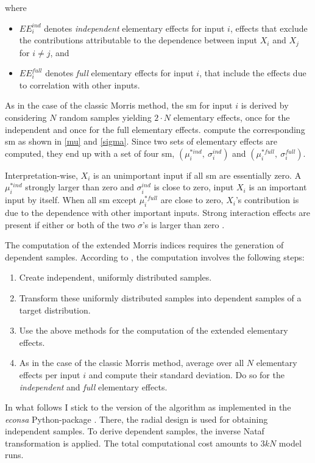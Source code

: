 \noindent where
\begin{itemize}
\item $EE_i^{ind}$ denotes \textit{independent} elementary effects for input $i$, effects that exclude the contributions attributable to the dependence between input $X_i$ and $X_j$ for $i \neq j$, and
\item $EE_i^{full}$ denotes \textit{full} elementary effects for input $i$, that include the effects due to correlation with other inputs.
\end{itemize}

As in the case of the classic Morris method, the sm for input $i$ is derived by considering $N$ random samples yielding $2 \cdot N$ elementary effects, once for the independent and once for the full elementary effects. \citet{GM17} compute the corresponding sm as shown in \cref{mu} and \cref{sigma}. Since two sets of elementary effects are computed, they end up with a set of four sm, $(\mu^{\ast ind}_i,\ \sigma_i^{ind})$ and $(\mu^{\ast full}_i,\ \sigma_i^{full})$.

Interpretation-wise, $X_i$ is an unimportant input if all sm are essentially zero. A $\mu^{\ast ind}_i$ strongly larger than zero and $\sigma_i^{ind}$ is close to zero, input $X_i$ is an important input by itself. When all sm except $\mu^{\ast full}_i$ are close to zero, $X_i$'s contribution is due to the dependence with other important inputs. Strong interaction effects are present if either or both of the two $\sigma$'s is larger than zero \citep{GM17}.

The computation of the extended Morris indices requires the generation of dependent samples. According to \citet{GM17}, the computation involves the following steps:

\begin{enumerate}
    \item Create independent, uniformly distributed samples.
    \item Transform these uniformly distributed samples into dependent samples of a target distribution.
    \item Use the above methods for the computation of the extended elementary effects.
    \item As in the case of the classic Morris method, average over all $N$ elementary effects per input $i$ and compute their standard deviation. Do so for the \textit{independent} and \textit{full} elementary effects.
\end{enumerate}

In what follows I stick to the version of the algorithm as implemented in the \textit{econsa} Python-package \citep{OSE21}. There, the radial design is used for obtaining independent samples. To derive dependent samples, the inverse Nataf transformation is applied. The total computational cost amounts to $3kN$ model runs.

